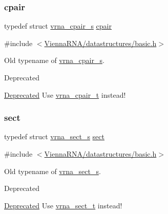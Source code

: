 \subsubsection{\texorpdfstring{cpair}{cpair}}
{\footnotesize\ttfamily typedef struct \hyperlink{group__data__structures_structvrna__cpair__s}{vrna\+\_\+cpair\+\_\+s} \hyperlink{group__data__structures_ga8412f116a2eb07b59ade9e14ca7c5ef1}{cpair}}



{\ttfamily \#include $<$\hyperlink{datastructures_2basic_8h}{Vienna\+R\+N\+A/datastructures/basic.\+h}$>$}



Old typename of \hyperlink{group__data__structures_structvrna__cpair__s}{vrna\+\_\+cpair\+\_\+s}. 

\begin{DoxyRefDesc}{Deprecated}
\item[\hyperlink{deprecated__deprecated000199}{Deprecated}]Use \hyperlink{group__data__structures_gae4fc91141cc69c6d8eaf1332cb991ecc}{vrna\+\_\+cpair\+\_\+t} instead! \end{DoxyRefDesc}
\mbox{\label{group__data__structures_gaaacedee1f05d3d45aa6764eca51a8876}} 
\subsubsection{\texorpdfstring{sect}{sect}}
{\footnotesize\ttfamily typedef struct \hyperlink{group__data__structures_structvrna__sect__s}{vrna\+\_\+sect\+\_\+s} \hyperlink{group__data__structures_gaaacedee1f05d3d45aa6764eca51a8876}{sect}}



{\ttfamily \#include $<$\hyperlink{datastructures_2basic_8h}{Vienna\+R\+N\+A/datastructures/basic.\+h}$>$}



Old typename of \hyperlink{group__data__structures_structvrna__sect__s}{vrna\+\_\+sect\+\_\+s}. 

\begin{DoxyRefDesc}{Deprecated}
\item[\hyperlink{deprecated__deprecated000200}{Deprecated}]Use \hyperlink{group__data__structures_gacc9cdae790dac75a7024e7069c0d4400}{vrna\+\_\+sect\+\_\+t} instead! \end{DoxyRefDesc}
\mbox{\label{group__data__structures_gaaeed53a7508c6ce549a98223e94b25df}} 
